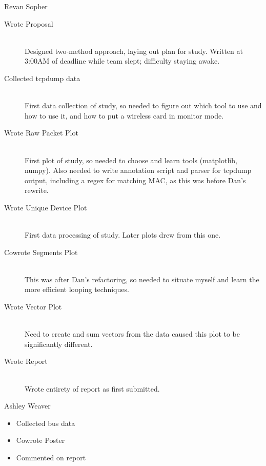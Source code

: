 \documentclass[12pt,journal,compsoc]{IEEEtran} %
\begin{document}
Revan Sopher
\begin{description}
\item [Wrote Proposal] \hfill \\
	Designed two-method approach, laying out plan for study. Written at 3:00AM of deadline while team slept; difficulty staying awake.
\item [Collected tcpdump data] \hfill \\
	First data collection of study, so needed to figure out which tool to use and how to use it, and how to put a wireless card in monitor mode.
\item [Wrote Raw Packet Plot] \hfill \\
	First plot of study, so needed to choose and learn tools (matplotlib, numpy). Also needed to write annotation script and parser for tcpdump output, including a regex for matching MAC, as this was before Dan's rewrite.
\item [Wrote Unique Device Plot] \hfill \\
	First data processing of study. Later plots drew from this one.
\item [Cowrote Segments Plot] \hfill \\
	This was after Dan's refactoring, so needed to situate myself and learn the more efficient looping techniques.
\item [Wrote Vector Plot] \hfill \\
	Need to create and sum vectors from the data caused this plot to be significantly different.
\item [Wrote Report] \hfill \\
	Wrote entirety of report as first submitted.
\end{description}
Ashley Weaver
\begin{itemize}
\item Collected bus data
\item Cowrote Poster
\item Commented on report
\end{itemize}

\clearpage
\end{document}
